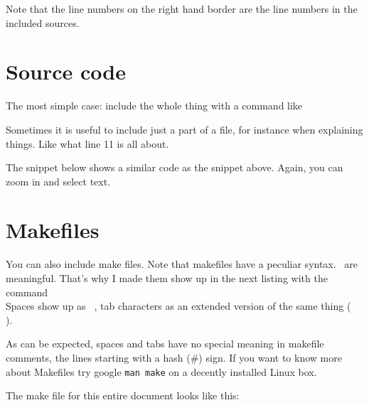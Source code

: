 Note that the line numbers on the right hand border are the line
numbers in the included sources.

\section{Source code}
The most simple case: include the whole thing with a command like \\
\verb##


Sometimes it is useful to include just a part of a file, for instance
when explaining things. Like what line 11 is all about.\\
\verb##



The snippet below shows a similar code as the snippet above.
Again, you can zoom in and select text.




\section{Makefiles}
You can also include make files.
Note that makefiles have a peculiar syntax. \ are meaningful. 
That's why I made them show up in the next listing with the command\\

\lstset{showspaces=true,showtabs=true}
Spaces show up as \lstinline| |, tab characters as an extended version
of the same thing (\lstinline|	|). 

As can be expected, spaces and tabs have no special meaning in
makefile comments, the lines starting with a hash (\#) sign. 
If you want to know more about Makefiles try google
\texttt{man make} on a decently installed Linux box.  

The make file for this entire document looks like this:



